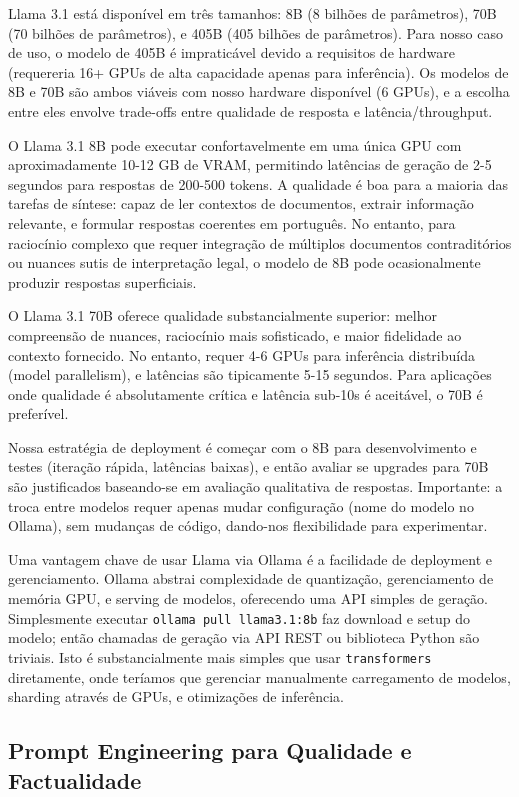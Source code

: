 \documentclass[12pt,a4paper]{article}
\begin{document}
Llama 3.1 está disponível em três tamanhos: 8B (8 bilhões de parâmetros), 70B (70 bilhões de parâmetros), e 405B (405 bilhões de parâmetros). Para nosso caso de uso, o modelo de 405B é impraticável devido a requisitos de hardware (requereria 16+ GPUs de alta capacidade apenas para inferência). Os modelos de 8B e 70B são ambos viáveis com nosso hardware disponível (6 GPUs), e a escolha entre eles envolve trade-offs entre qualidade de resposta e latência/throughput.

O Llama 3.1 8B pode executar confortavelmente em uma única GPU com aproximadamente 10-12 GB de VRAM, permitindo latências de geração de 2-5 segundos para respostas de 200-500 tokens. A qualidade é boa para a maioria das tarefas de síntese: capaz de ler contextos de documentos, extrair informação relevante, e formular respostas coerentes em português. No entanto, para raciocínio complexo que requer integração de múltiplos documentos contraditórios ou nuances sutis de interpretação legal, o modelo de 8B pode ocasionalmente produzir respostas superficiais.

O Llama 3.1 70B oferece qualidade substancialmente superior: melhor compreensão de nuances, raciocínio mais sofisticado, e maior fidelidade ao contexto fornecido. No entanto, requer 4-6 GPUs para inferência distribuída (model parallelism), e latências são tipicamente 5-15 segundos. Para aplicações onde qualidade é absolutamente crítica e latência sub-10s é aceitável, o 70B é preferível.

Nossa estratégia de deployment é começar com o 8B para desenvolvimento e testes (iteração rápida, latências baixas), e então avaliar se upgrades para 70B são justificados baseando-se em avaliação qualitativa de respostas. Importante: a troca entre modelos requer apenas mudar configuração (nome do modelo no Ollama), sem mudanças de código, dando-nos flexibilidade para experimentar.

Uma vantagem chave de usar Llama via Ollama é a facilidade de deployment e gerenciamento. Ollama abstrai complexidade de quantização, gerenciamento de memória GPU, e serving de modelos, oferecendo uma API simples de geração. Simplesmente executar \texttt{ollama pull llama3.1:8b} faz download e setup do modelo; então chamadas de geração via API REST ou biblioteca Python são triviais. Isto é substancialmente mais simples que usar \texttt{transformers} diretamente, onde teríamos que gerenciar manualmente carregamento de modelos, sharding através de GPUs, e otimizações de inferência.

\subsection{Prompt Engineering para Qualidade e Factualidade}
\end{document}
